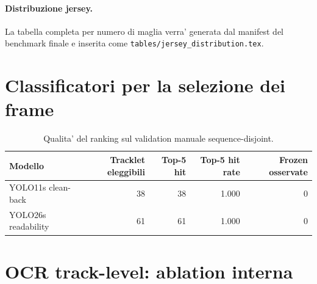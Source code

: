\documentclass[11pt,a4paper]{article}
\begin{document}
\paragraph{Distribuzione jersey.}
La tabella completa per numero di maglia verra' generata dal manifest del
benchmark finale e inserita come \texttt{tables/jersey\_distribution.tex}.

\section{Classificatori per la selezione dei frame}

\begin{table}[htbp]
  \centering
  \caption{Risultati interni dei classificatori di frame. I valori non
  disponibili nei checkpoint upstream sono indicati con ``--''.}
  \label{tab:frame-classifiers}
\end{table}

\begin{table}[htbp]
  \centering
  \caption{Qualita' del ranking sul validation manuale sequence-disjoint.}
  \label{tab:frame-ranking}
  \begin{tabular}{lrrrr}
    \toprule
    Modello & Tracklet eleggibili & Top-5 hit & Top-5 hit rate & Frozen osservate \\
    \midrule
    YOLO11s clean-back & 38 & 38 & 1.000 & 0 \\
    YOLO26s readability & 61 & 61 & 1.000 & 0 \\
    \bottomrule
  \end{tabular}
\end{table}

\section{OCR track-level: ablation interna}
\end{document}
